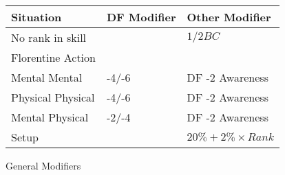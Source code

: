 
\begin{SHTable}[h]
	\begin{tabular}{lll}
	Situation			& DF Modifier	& Other Modifier \\ 
	\hline
	No rank in skill 	& 				& \(1/2 BC \)	 \\
	Florentine Action	& 				& 					\\  \hline
	Mental Mental		& -4/-6			& DF -2 Awareness \\
	Physical Physical	& -4/-6			& DF -2 Awareness	\\
	Mental Physical		& -2/-4			& DF -2 Awareness	\\
	Setup				& 				& \( 20\% + 2\% \times Rank \) \\ 
    \end{tabular}
    \caption{General Modifiers}
\end{SHTable}
